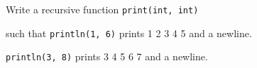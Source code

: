 Write a recursive function \texttt{print(int, int)}

such that \texttt{println(1, 6)} prints 1 2 3 4 5 and a newline.

\texttt{println(3, 8)} prints 3 4 5 6 7 and a newline.

